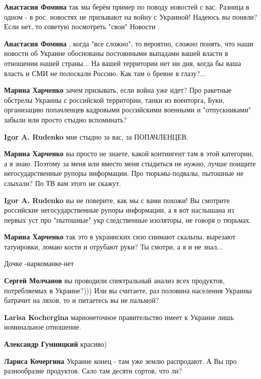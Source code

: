 \begin{itemize}
\begin{itemize}
\textbf{Анастасия Фомина} так мы берём пример по поводу новостей с вас. Разница в одном - в рос. новостях не призывают на войну с Украиной! Надеюсь вы поняли? Если нет, то советую посмотреть "свои" Новости .

\textbf{Анастасия Фомина} , когда "все сложно", то вероятно, сложно понять, что наши новости об Украине обоснованы постоянными выпадами вашей власти в отношении нашей страны... На вашей территории нет ни дня, когда бы ваша власть и СМИ не полоскали Россию. Как там о бревне в глазу?...

\textbf{Марина Харченко} зачем призывать, если война уже идет? Про ракетные обстрелы Украины с российской территории, танки из военторга, Буки, организацию попачленцев кадровыми российскими военными и "отпускниками" забыли или просто стыдно вспоминать?

\textbf{Igor A. Rudenko} мне стыдно за вас, за ПОПАЧЛЕНЦЕВ.

\textbf{Марина Харченко} вы просто не знаете, какой контингент там в этой категории, а я знаю. Поэтому за меня или вместо меня стыдиться не нужно, лучше поищите негосударственные рупоры информации. Про тюрьмы-подвалы, пытошные не слыхали? По ТВ вам этого не скажут.

\textbf{Igor A. Rudenko} вы не поверите, как мы с вами похожи! Вы смотрите российские негосударственные рупоры информации, а я вот наслышана из первых уст про "пытошные" укр следственные изоляторы, не говоря о тюрьмах.

\textbf{Марина Харченко} так это в украинских сизо снимают скальпы, вырезают татуировки, ломаю кости и отрубают руки? Ты смотри, а я и не знал...

Дочке -наркоманке-нет

\textbf{Сергей Молчанов} вы проводили спектральный анализ всех продуктов, потребляемых в Украине?))) Или вы считаете, раз половина населения Украины батрачит на ляхов, то и питаетесь вы не пальмой?

\textbf{Larisa Kochergina} марионеточное правительство имеет к Украине лишь номинальное отношение.

\textbf{Александр Гумницкий} красиво)

\textbf{Лариса Кочергина} Украине конец - там уже землю распродают. А Вы про разнообразие продуктов. Сало там десяти сортов, что ли?


\end{itemize}
\end{itemize}

